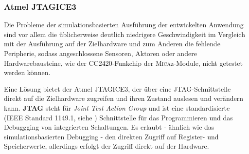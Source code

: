 \subsubsection{Atmel JTAGICE3}
\label{sec:JTAGICE3}
Die Probleme der simulationsbasierten Ausführung der entwickelten Anwendung sind vor allem die üblicherweise deutlich niedrigere Geschwindigkeit im Vergleich mit der Ausführung auf der Zielhardware und zum Anderen die fehlende Peripherie, sodass angeschlossene Sensoren, Aktoren oder andere Hardwarebausteine, wie der CC2420-Funkchip der \textsc{Mica}z-Module, nicht getestet werden können.

Eine Lösung bietet der Atmel JTAGICE3, der über eine JTAG-Schnittstelle direkt auf die Zielhardware zugreifen und ihren Zustand auslesen und verändern kann. \textbf{JTAG} steht für \textit{Joint Test Action Group} und ist eine standardisierte (IEEE Standard 1149.1, siehe \cite{IEEE1149:2014:Online}) Schnittstelle für das Programmieren und das Debuggging von integrierten Schaltungen. Es erlaubt - ähnlich wie das simulationsbasierten Debugging - den direkten Zugriff auf Register- und Speicherwerte, allerdings erfolgt der Zugriff direkt auf der Hardware. 